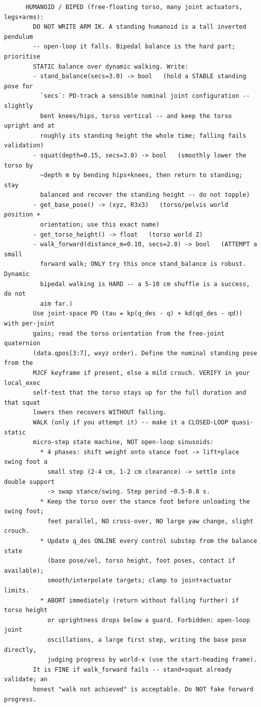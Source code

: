 {\begin{verbatim}
      HUMANOID / BIPED (free-floating torso, many joint actuators, legs+arms):
        DO NOT WRITE ARM IK. A standing humanoid is a tall inverted pendulum
        -- open-loop it falls. Bipedal balance is the hard part; prioritise
        STATIC balance over dynamic walking. Write:
        - stand_balance(secs=3.0) -> bool   (hold a STABLE standing pose for
          `secs`: PD-track a sensible nominal joint configuration -- slightly
          bent knees/hips, torso vertical -- and keep the torso upright and at
          roughly its standing height the whole time; falling fails validation)
        - squat(depth=0.15, secs=3.0) -> bool   (smoothly lower the torso by
          ~depth m by bending hips+knees, then return to standing; stay
          balanced and recover the standing height -- do not topple)
        - get_base_pose() -> (xyz, R3x3)   (torso/pelvis world position +
          orientation; use this exact name)
        - get_torso_height() -> float   (torso world Z)
        - walk_forward(distance_m=0.10, secs=2.0) -> bool   (ATTEMPT a small
          forward walk; ONLY try this once stand_balance is robust. Dynamic
          bipedal walking is HARD -- a 5-10 cm shuffle is a success, do not
          aim far.)
        Use joint-space PD (tau = kp(q_des - q) + kd(qd_des - qd)) with per-joint
        gains; read the torso orientation from the free-joint quaternion
        (data.qpos[3:7], wxyz order). Define the nominal standing pose from the
        MJCF keyframe if present, else a mild crouch. VERIFY in your local_exec
        self-test that the torso stays up for the full duration and that squat
        lowers then recovers WITHOUT falling.
        WALK (only if you attempt it) -- make it a CLOSED-LOOP quasi-static
        micro-step state machine, NOT open-loop sinusoids:
          * 4 phases: shift weight onto stance foot -> lift+place swing foot a
            small step (2-4 cm, 1-2 cm clearance) -> settle into double support
            -> swap stance/swing. Step period ~0.5-0.8 s.
          * Keep the torso over the stance foot before unloading the swing foot;
            feet parallel, NO cross-over, NO large yaw change, slight crouch.
          * Update q_des ONLINE every control substep from the balance state
            (base pose/vel, torso height, foot poses, contact if available);
            smooth/interpolate targets; clamp to joint+actuator limits.
          * ABORT immediately (return without falling further) if torso height
            or uprightness drops below a guard. Forbidden: open-loop joint
            oscillations, a large first step, writing the base pose directly,
            judging progress by world-x (use the start-heading frame).
        It is FINE if walk_forward fails -- stand+squat already validate; an
        honest "walk not achieved" is acceptable. Do NOT fake forward progress.


\end{verbatim}}

